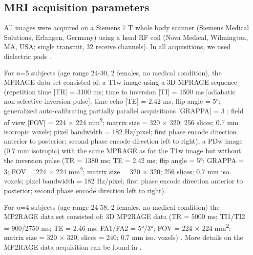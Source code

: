 \subsection{MRI acquisition parameters}
All images were acquired on a Siemens 7 T whole body scanner (Siemens Medical Solutions, Erlangen, Germany) using a head RF coil (Nova Medical, Wilmington, MA, USA; single transmit, 32 receive channels). In all acquisitions, we used dielectric pads \parencite{Teeuwisse2012}.

For $n$=5 subjects (age range 24-30, 2 females, no medical condition), the MPRAGE data set consisted of: a T1w image using a 3D MPRAGE sequence (repetition time [TR] = 3100 ms; time to inversion [TI] = 1500 ms [adiabatic non-selective inversion pulse]; time echo [TE] = 2.42 ms; flip angle = 5°; generalized auto-calibrating partially parallel acquisitions [GRAPPA] = 3 \parencite{Griswold2002}; field of view [FOV] = 224 × 224 mm\textsuperscript{2}; matrix size = 320 × 320; 256 slices; 0.7 mm isotropic voxels; pixel bandwidth = 182 Hz/pixel; first phase encode direction anterior to posterior; second phase encode direction left to right), a PDw image (0.7 mm isotropic) with the same MPRAGE as for the T1w image but without the inversion pulse (TR = 1380 ms; TE = 2.42 ms; flip angle = 5°; GRAPPA = 3; FOV = 224 × 224 mm\textsuperscript{2}; matrix size = 320 × 320; 256 slices; 0.7 mm iso. voxels; pixel bandwidth = 182 Hz/pixel; first phase encode direction anterior to posterior; second phase encode direction left to right).

For $n$=4 subjects (age range 24-58, 2 females, no medical condition) the MP2RAGE data set consisted of: 3D MP2RAGE data (TR = 5000 ms; TI1/TI2 = 900/2750 ms; TE = 2.46 ms; FA1/FA2 = 5°/3°; FOV = 224 × 224 mm\textsuperscript{2}; matrix size = 320 × 320; slices = 240; 0.7 mm iso. voxels) \parencite{Marques2010}. More details on the MP2RAGE data acquisition can be found in \cite{Haast2016}.

